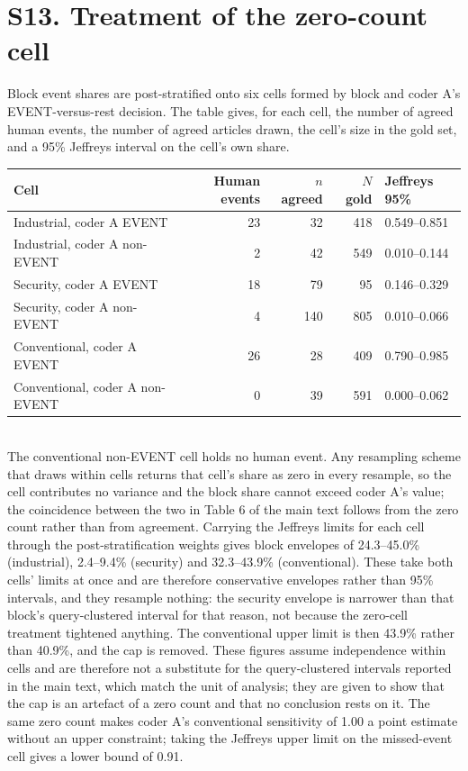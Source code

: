 \documentclass[11pt]{article}
\begin{document}
\section*{S13. Treatment of the zero-count cell}
Block event shares are post-stratified onto six cells formed by block and coder A's EVENT-versus-rest decision. The table gives, for each cell, the number of agreed human events, the number of agreed articles drawn, the cell's size in the gold set, and a 95\% Jeffreys interval on the cell's own share.\\[4pt]
\begin{tabular}{lrrrl}\toprule Cell & Human events & $n$ agreed & $N$ gold & Jeffreys 95\% \\\midrule
Industrial, coder A EVENT & 23 & 32 & 418 & 0.549--0.851 \\
Industrial, coder A non-EVENT & 2 & 42 & 549 & 0.010--0.144 \\
Security, coder A EVENT & 18 & 79 & 95 & 0.146--0.329 \\
Security, coder A non-EVENT & 4 & 140 & 805 & 0.010--0.066 \\
Conventional, coder A EVENT & 26 & 28 & 409 & 0.790--0.985 \\
Conventional, coder A non-EVENT & 0 & 39 & 591 & 0.000--0.062 \\
\bottomrule\end{tabular}\\[6pt]
The conventional non-EVENT cell holds no human event. Any resampling scheme that draws within cells returns that cell's share as zero in every resample, so the cell contributes no variance and the block share cannot exceed coder A's value; the coincidence between the two in Table 6 of the main text follows from the zero count rather than from agreement. Carrying the Jeffreys limits for each cell through the post-stratification weights gives block envelopes of 24.3--45.0\% (industrial), 2.4--9.4\% (security) and 32.3--43.9\% (conventional). These take both cells' limits at once and are therefore conservative envelopes rather than 95\% intervals, and they resample nothing: the security envelope is narrower than that block's query-clustered interval for that reason, not because the zero-cell treatment tightened anything. The conventional upper limit is then 43.9\% rather than 40.9\%, and the cap is removed. These figures assume independence within cells and are therefore not a substitute for the query-clustered intervals reported in the main text, which match the unit of analysis; they are given to show that the cap is an artefact of a zero count and that no conclusion rests on it. The same zero count makes coder A's conventional sensitivity of 1.00 a point estimate without an upper constraint; taking the Jeffreys upper limit on the missed-event cell gives a lower bound of 0.91.
\end{document}
